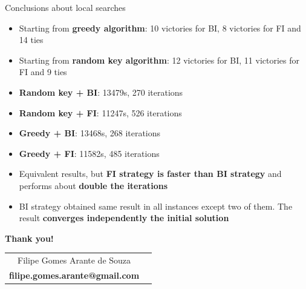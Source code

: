\documentclass[aspectratio=169,mathserif]{beamer}
\begin{document}
\begin{frame}{Conclusions about local searches}
    \begin{itemize}
        \item Starting from \textbf{greedy algorithm}: 10 victories for BI, 8 victories for FI and 14 ties
        \item Starting from \textbf{random key algorithm}: 12 victories for BI, 11 victories for FI and 9 ties
        \item \textbf{Random key + BI}: 13479s, 270 iterations
        \item \textbf{Random key + FI}: 11247s, 526 iterations
        \item \textbf{Greedy + BI}: 13468s, 268 iterations
        \item \textbf{Greedy + FI}: 11582s, 485 iterations
        \item Equivalent results, but \textbf{FI strategy is faster than BI strategy} and performs about \textbf{double the iterations}
        \item BI strategy obtained same result in all instances except two of them. The result \textbf{converges independently the initial solution}
    \end{itemize}
\end{frame}

\begin{frame}
    \begin{center}
        {\huge \bf \color{mypink} Thank you!} \\ \vspace{1cm}
        \begin{tabular}{cc}
            Filipe Gomes Arante de Souza               \\
            {\bf \small filipe.gomes.arante@gmail.com} \\
        \end{tabular}
    \end{center}
\end{frame}
\end{document}
